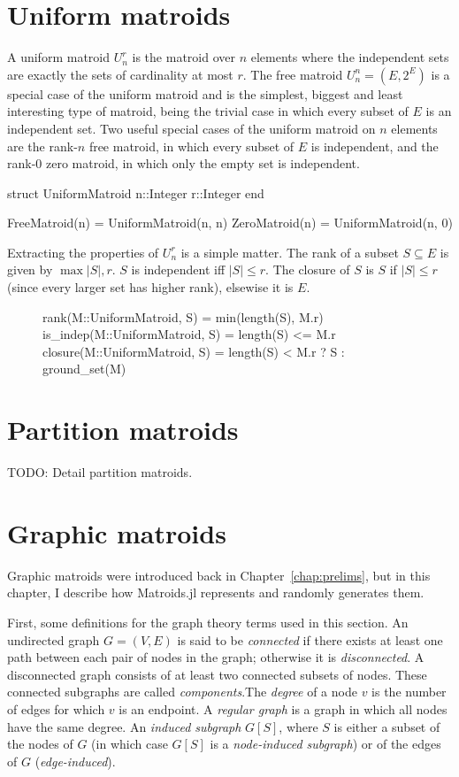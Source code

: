 \section{Uniform matroids}
A uniform matroid $U_n^r$ is the matroid over $n$ elements where the independent sets are exactly the sets of cardinality at most $r$. The free matroid $U_n^n = (E, 2^E)$ is a special case of the uniform matroid and is the simplest, biggest and least interesting type of matroid, being the trivial case in which every subset of $E$ is an independent set. Two useful special cases of the uniform matroid on $n$ elements are the rank-$n$ free matroid, in which every subset of $E$ is independent, and the rank-$0$ zero matroid, in which only the empty set is independent.

\begin{jllisting}
struct UniformMatroid
  n::Integer
  r::Integer
end

FreeMatroid(n) = UniformMatroid(n, n)
ZeroMatroid(n) = UniformMatroid(n, 0)
\end{jllisting}

Extracting the properties of $U_n^r$ is a simple matter. The rank of a subset $S\subseteq E$ is given by $\max{|S|, r}$. $S$ is independent iff $|S|\leq r$. The closure of $S$ is $S$ if $|S| \leq r$ (since every larger set has higher rank), elsewise it is $E$.
\begin{figure}[ht!]
\begin{jllisting}    
rank(M::UniformMatroid, S) = min(length(S), M.r)
is_indep(M::UniformMatroid, S) = length(S) <= M.r
closure(M::UniformMatroid, S) = length(S) < M.r ? S : ground_set(M)
\end{jllisting}
\end{figure}

\section{Partition matroids}
TODO: Detail partition matroids.
\skelpar


\section{Graphic matroids}
Graphic matroids were introduced back in Chapter~\ref{chap:prelims}, but in this chapter, I describe how Matroids.jl represents and randomly generates them.

First, some definitions for the graph theory terms used in this section. An undirected graph $G=(V,E)$ is said to be \textit{connected} if there exists at least one path between each pair of nodes in the graph; otherwise it is \textit{disconnected}. A disconnected graph consists of at least two connected subsets of nodes. These connected subgraphs are called \textit{components}.The \textit{degree} of a node $v$ is the number of edges for which $v$ is an endpoint. A \textit{regular graph} is a graph in which all nodes have the same degree. An \textit{induced subgraph} $G[S]$, where $S$ is either a subset of the nodes of $G$ (in which case $G[S]$ is a \textit{node-induced subgraph}) or of the edges of $G$ (\textit{edge-induced}).

